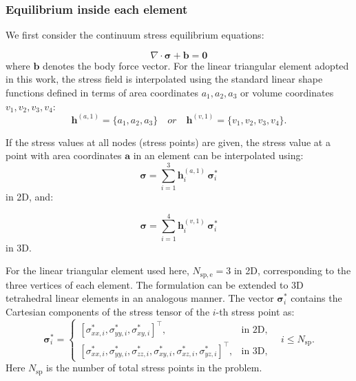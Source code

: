 \subsubsection{Equilibrium inside each element}
We first consider the continuum stress equilibrium equations:

\begin{equation}
\nabla \cdot \boldsymbol{\sigma} + \boldsymbol{b} = \boldsymbol{0}
\label{eq:continuous_equilibrium}
\end{equation}
where $\boldsymbol{b}$ denotes the body force vector.
For the linear triangular element adopted in this work, the stress field is interpolated using the standard linear shape functions defined in terms of area coordinates $a_1,a_2,a_3$ or volume coordinates $v_1,v_2,v_3,v_4$:
\begin{equation}
\boldsymbol{h}^{(a,1)}=\{a_1,a_2,a_3\} \quad or \quad \boldsymbol{h}^{(v,1)}=\{v_1,v_2,v_3, v_4\}.
\end{equation}

If the stress values at all nodes (stress points) are given, the stress value at a point with area coordinates $\boldsymbol{a}$ in an element can be interpolated using:
\begin{equation}
\boldsymbol{\sigma} = \sum_{i=1}^{3} \boldsymbol{h}_i^{(a,1)} \, \boldsymbol{\sigma}_i^*
\label{eq:interpolate_stress}
\end{equation} in 2D, and:

\begin{equation}
\boldsymbol{\sigma} = \sum_{i=1}^{4} \boldsymbol{h}_i^{(v,1)} \, \boldsymbol{\sigma}_i^*
\label{eq:interpolate_stress_3D}
\end{equation} in 3D. 


For the linear triangular element used here, $N_\mathrm{sp,e}=3$ in 2D, corresponding to the three vertices of each element. The formulation can be extended to 3D tetrahedral linear elements in an analogous manner. The vector $\boldsymbol{\sigma}^*_i$ contains the Cartesian components of the stress tensor of the $i$-th stress point as:
\begin{equation}
\boldsymbol{\sigma}_i^* =
\begin{cases}
[\sigma_{xx,i}^*, \sigma_{yy,i}^*, \sigma_{xy,i}^*]^\top, 
& \text{in 2D}, \\[2mm]
[\sigma_{xx,i}^*, \sigma_{yy,i}^*, \sigma_{zz,i}^*, 
\sigma_{xy,i}^*, \sigma_{xz,i}^*, \sigma_{yz,i}^*]^\top, 
& \text{in 3D},
\end{cases}
\quad i \leq N_\mathrm{sp}.
\label{eq:stress_tensor}
\end{equation} Here $N_\mathrm{sp}$ is the number of total stress points in the problem. 

